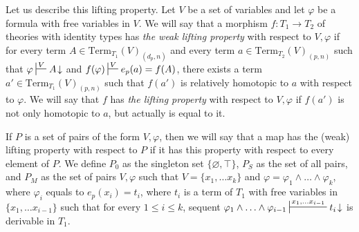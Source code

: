 \documentclass[reqno]{amsart}
\theoremstyle{definition}
\theoremstyle{remark}
\newcommand{\Term}{\mathrm{Term}}
\numberwithin{figure}{section}
\begin{document}
Let us describe this lifting property.
Let $V$ be a set of variables and let $\varphi$ be a formula with free variables in $V$.
We will say that a morphism $f : T_1 \to T_2$ of theories with identity types has \emph{the weak lifting property} with respect to $V,\varphi$ if
for every term $A \in \Term_{T_1}(V)_{(d_p,n)}$ and every term $a \in \Term_{T_2}(V)_{(p,n)}$ such that $\varphi \sststile{}{V} A\!\downarrow$ and $f(\varphi) \sststile{}{V} e_p(a) = f(A)$,
there exists a term $a' \in \Term_{T_1}(V)_{(p,n)}$ such that $f(a')$ is relatively homotopic to $a$ with respect to $\varphi$.
We will say that $f$ has \emph{the lifting property} with respect to $V,\varphi$ if $f(a')$ is not only homotopic to $a$, but actually is equal to it.

If $P$ is a set of pairs of the form $V,\varphi$, then we will say that a map has the (weak) lifting property with respect to $P$ if it has this property with respect to every element of $P$.
We define $P_0$ as the singleton set $\{ \varnothing,\top \}$, $P_S$ as the set of all pairs, and $P_M$ as the set of pairs $V,\varphi$ such that $V = \{ x_1, \ldots x_k \}$
and $\varphi = \varphi_1 \land \ldots \land \varphi_k$, where $\varphi_i$ equals to $e_p(x_i) = t_i$,
where $t_i$ is a term of $T_1$ with free variables in $\{ x_1, \ldots x_{i-1} \}$ such that for every $1 \leq i \leq k$,
sequent $\varphi_1 \land \ldots \land \varphi_{i-1} \sststile{}{x_1, \ldots x_{i-1}} t_i\!\downarrow$ is derivable in $T_1$.
\end{document}
